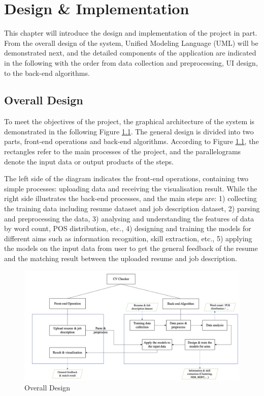 \chapter{Design \& Implementation}
\label{ch:design}

This chapter will introduce the design and implementation of the project in part. From the overall design of the system, Unified Modeling Language (UML) will be demonstrated next, and the detailed components of the application are indicated in the following with the order from data collection and preprocessing, UI design, to the back-end algorithms.

\section{Overall Design}

To meet the objectives of the project, the graphical architecture of the system is demonstrated in the following Figure \ref{fig:14}. The general design is divided into two parts, front-end operations and back-end algorithms. According to Figure \ref{fig:14},  the rectangles refer to the main processes of the project, and the parallelograms denote the input data or output products of the steps.


The left side of the diagram indicates the front-end operations, containing two simple processes: uploading data and receiving the visualisation result. While the right side illustrates the back-end processes, and the main steps are: 1) collecting the training data including resume dataset and job description dataset, 2) parsing and preprocessing the data, 3) analysing and understanding the features of data by word count, POS distribution, etc., 4) designing and training the models for different aims such as information recognition, skill extraction, etc., 5) applying the models on the input data from user to get the general feedback of the resume and the matching result between the uploaded resume and job description.

\label{overall_design}

 \begin{figure}[H]
    \centering
    \includegraphics[width=1.2\textwidth]{images/overall_design.png}
    \caption{Overall Design}
    \label{fig:14}
\end{figure}





